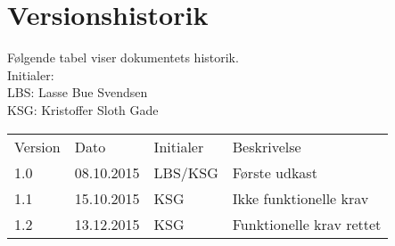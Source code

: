 \documentclass[pdftex, 11pt, a4paper, twoside, danish]{memoir}
\begin{document}
    \begingroup
        \hypersetup{linkcolor=black}
        \tableofcontents*	%
    \endgroup
    
    \section*{Versionshistorik}
    Følgende tabel viser dokumentets historik.\\    
    Initialer:\\
    LBS: Lasse Bue Svendsen\\
    KSG: Kristoffer Sloth Gade
    \bgroup
    \def\arraystretch{1.4}
    \begin{center}
    	\begin{tabular}{lllp{186pt}}
    		\rowcolor{grey} Version	& Dato 		& Initialer & Beskrivelse \\
    		1.0	& 08.10.2015 	& LBS/KSG	& Første udkast\\
    		1.1	& 15.10.2015	& KSG		& Ikke funktionelle krav\\
    		1.2	& 13.12.2015	& KSG		& Funktionelle krav rettet
       	\end{tabular}
    \end{center}
    \egroup
    
    
    
    
    
    
    
    
    


    
\end{document}
